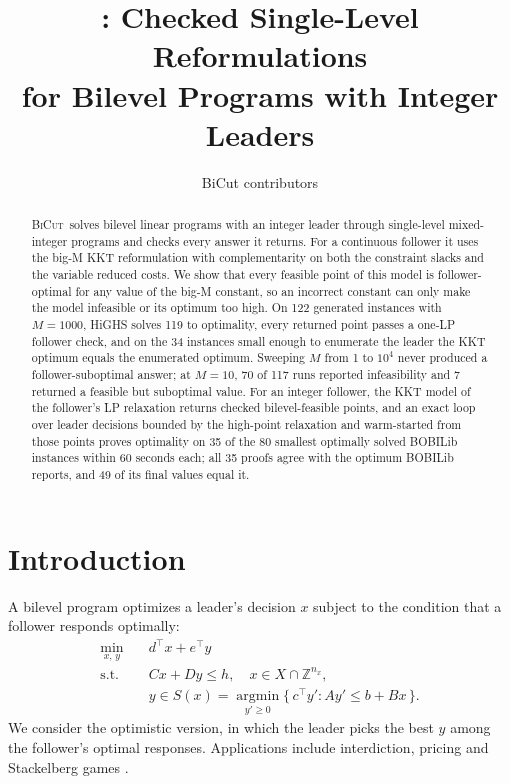 \documentclass[11pt]{article}
\title{\BiCut: Checked Single-Level Reformulations\\for Bilevel Programs with Integer Leaders}
\author{BiCut contributors}
\date{}
\newcommand{\Z}{\mathbb{Z}}
\newcommand{\BiCut}{\textsc{BiCut}}
\begin{document}
\maketitle

\begin{abstract}
\BiCut\ solves bilevel linear programs with an integer leader through
single-level mixed-integer programs and checks every answer it returns. For a
continuous follower it uses the big-M KKT reformulation with complementarity
on both the constraint slacks and the variable reduced costs. We show that
every feasible point of this model is follower-optimal for any value of the
big-M constant, so an incorrect constant can only make the model infeasible
or its optimum too high. On 122 generated instances with $M=1000$, HiGHS
solves 119 to optimality, every returned point passes a one-LP follower
check, and on the 34 instances small enough to enumerate the leader the KKT
optimum equals the enumerated optimum. Sweeping $M$ from 1 to $10^4$ never
produced a follower-suboptimal answer; at $M=10$, 70 of 117 runs reported
infeasibility and 7 returned a feasible but suboptimal value. For an integer
follower, the KKT model of the follower's LP relaxation returns checked
bilevel-feasible points, and an exact loop over leader decisions bounded by
the high-point relaxation and warm-started from those points proves
optimality on 35 of the 80 smallest optimally solved BOBILib instances
within 60 seconds each; all 35 proofs agree with the optimum BOBILib
reports, and 49 of its final values equal it.
\end{abstract}

\section{Introduction}
\label{sec:intro}

A bilevel program optimizes a leader's decision $x$ subject to the
condition that a follower responds optimally:
\begin{align}
\min_{x,\,y}\quad & d^\top x + e^\top y \label{eq:bilevel}\\
\text{s.t.}\quad & Cx + Dy \le h,\quad x \in X \cap \Z^{n_x}, \nonumber\\
& y \in S(x) = \operatorname*{argmin}_{y' \ge 0}\{\, c^\top y' : Ay' \le b + Bx \,\}. \nonumber
\end{align}
We consider the optimistic version, in which the leader picks the best $y$
among the follower's optimal responses. Applications include interdiction,
pricing and Stackelberg games \cite{colson2007overview, dempe2002foundations}.
\end{document}

